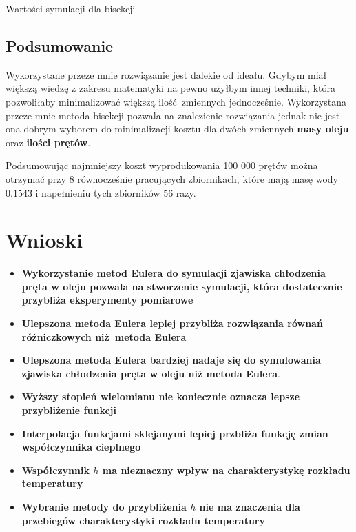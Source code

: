 \documentclass[varwidth,12pt,a4paper]{article}
\begin{document}
\afterpage{\clearpage}

\begin{table}[H]
    \hspace{-40pt}
    \centering{}
    \caption{Wartości symulacji dla bisekcji}
\end{table}

\subsection{Podsumowanie}

Wykorzystane przeze mnie rozwiązanie jest dalekie od ideału. Gdybym miał większą wiedzę z zakresu
matematyki na pewno użyłbym innej techniki, która pozwoliłaby minimalizować większą ilość zmiennych
jednocześnie. Wykorzystana przeze mnie metoda bisekcji pozwala na znalezienie rozwiązania jednak
nie jest ona dobrym wyborem do minimalizacji kosztu dla dwóch zmiennych \textbf{masy oleju} oraz
\textbf{ilości prętów}.

Podsumowując najmniejszy koszt wyprodukowania 100 000 prętów można otrzymać przy $8$ równocześnie
pracujących zbiornikach, które mają masę wody $0.1543$ i napełnieniu tych zbiorników $56$ razy.

\section{Wnioski}

\begin{itemize}
    \item \textbf{Wykorzystanie metod Eulera do symulacji zjawiska chłodzenia pręta w oleju pozwala na stworzenie symulacji, która dostatecznie przybliża eksperymenty pomiarowe}
    \item \textbf{Ulepszona metoda Eulera lepiej przybliża rozwiązania równań różniczkowych niż metoda Eulera}
    \item \textbf{Ulepszona metoda Eulera bardziej nadaje się do symulowania zjawiska chłodzenia pręta w oleju niż metoda Eulera}.
    \item \textbf{Wyższy stopień wielomianu nie koniecznie oznacza lepsze przybliżenie funkcji}
    \item \textbf{Interpolacja funkcjami sklejanymi lepiej przbliża funkcję zmian współczynnika cieplnego}
    \item \textbf{Współczynnik $h$ ma nieznaczny wpływ na charakterystykę rozkładu temperatury}
    \item \textbf{Wybranie metody do przybliżenia $h$ nie ma znaczenia dla przebiegów charakterystyki rozkładu temperatury}
\end{itemize}
\end{document}
